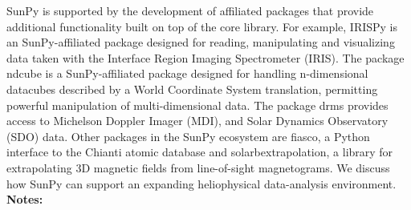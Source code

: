 \documentclass{report}
\begin{document}
{{{{{{{{{{{{{{{{{{{{{{{{{{{{{{{{{{{{{{{{{{{{{{{{{{{{{{{{{{{{{{{{{{{{{{{{{{{{{{{{{{SunPy is supported by the development of affiliated packages that provide additional functionality built on top of the core library. For example, IRISPy is an SunPy-affiliated package designed for reading, manipulating and visualizing data taken with the Interface Region Imaging Spectrometer (IRIS).  The package ndcube is a SunPy-affiliated package designed for handling n-dimensional datacubes described by a World Coordinate System translation, permitting powerful manipulation of multi-dimensional data. The package drms provides access to Michelson Doppler Imager (MDI), and Solar Dynamics Observatory (SDO) data.  Other packages in the SunPy ecosystem are fiasco, a Python interface to the Chianti atomic database and solarbextrapolation, a library for extrapolating 3D magnetic fields from line-of-sight magnetograms.  We discuss how SunPy can support an expanding heliophysical data-analysis environment.\newline
{\bf Notes:}\newline
{\newpage
}}}}}}}}}}}}}}}}}}}}}}}}}}}}}}}}}}}}}}}}}}}}}}}}}}}}}}}}}}}}}}}}}}}}}}}}}}}}}}}}}}}
\end{document}
